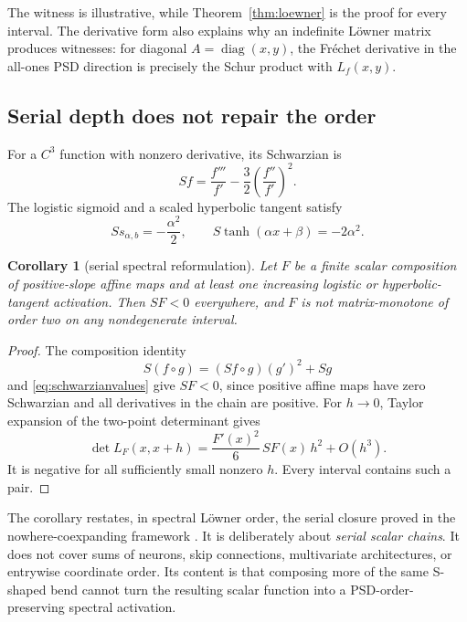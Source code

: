 \documentclass[11pt]{article}
\newtheorem{corollary}[theorem]{Corollary}
\newcommand{\diag}{\operatorname{diag}}
\begin{document}
The witness is illustrative, while Theorem~\ref{thm:loewner} is the proof for every interval.  The derivative form
also explains why an indefinite L\"owner matrix produces witnesses: for diagonal
$A=\diag(x,y)$, the Fr\'echet derivative in the all-ones PSD direction is precisely the Schur product with
$L_f(x,y)$.

\subsection{Serial depth does not repair the order}

For a $C^3$ function with nonzero derivative, its Schwarzian is
\begin{equation}
 Sf=\frac{f'''}{f'}-\frac32\left(\frac{f''}{f'}\right)^2.
 \label{eq:schwarzian}
\end{equation}
The logistic sigmoid and a scaled hyperbolic tangent satisfy
\begin{equation}
 S s_{\alpha,b}=-\frac{\alpha^2}{2},\qquad
 S\tanh(\alpha x+\beta)=-2\alpha^2.
 \label{eq:schwarzianvalues}
\end{equation}

\begin{corollary}[serial spectral reformulation]
\label{thm:serial}
Let $F$ be a finite scalar composition of positive-slope affine maps and at least one increasing logistic or
hyperbolic-tangent activation.  Then $SF<0$ everywhere, and $F$ is not matrix-monotone of order two on any
nondegenerate interval.
\end{corollary}

\begin{proof}
The composition identity
\begin{equation}
 S(f\circ g)=(Sf\circ g)(g')^2+Sg
 \label{eq:schwarzchain}
\end{equation}
and \eqref{eq:schwarzianvalues} give $SF<0$, since positive affine maps have zero Schwarzian and all derivatives in
the chain are positive.  For $h\to0$, Taylor expansion of the two-point determinant gives
\begin{equation}
 \det L_F(x,x+h)=\frac{F'(x)^2}{6}\,SF(x)\,h^2+O(h^3).
 \label{eq:localschwarz}
\end{equation}
It is negative for all sufficiently small nonzero $h$.  Every interval contains such a pair.
\end{proof}

The corollary restates, in spectral L\"owner order, the serial closure proved in the nowhere-coexpanding framework
\cite{cook2023}.  It is deliberately about \emph{serial scalar chains}.  It does not cover sums of neurons, skip
connections, multivariate architectures, or entrywise coordinate order.  Its content is that composing more of the
same S-shaped bend cannot turn the resulting scalar function into a PSD-order-preserving spectral activation.
\end{document}
